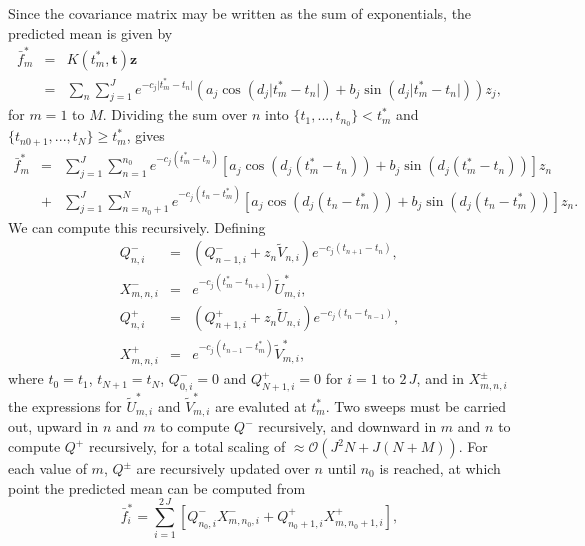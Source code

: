 \documentclass[manuscript, letterpaper]{aastex6}
\newcommand{\bvec}[1]{{\ensuremath{\boldsymbol{#1}}}}
\begin{document}
Since the covariance matrix may be written as the sum of exponentials, the predicted mean is given by
\begin{eqnarray}
\bar f^*_m &=& K(t^*_m,\bvec{t}) \bvec{z} \\
&=& \sum_n \sum_{j=1}^J e^{-c_j \vert t^*_m-t_n\vert}\left(a_j \cos{(d_j \vert t^*_m-t_n\vert)} +b_j \sin{(d_j \vert t^*_m-t_n\vert)}\right) z_j,
\end{eqnarray}
for $m =1$ to $M$.
Dividing the sum over $n$ into $\{t_1,...,t_{n_0}\} < t^*_m$ and
$\{t_{n0+1},...,t_N\} \ge t^*_m$, gives
\begin{eqnarray}
\bar f^*_m &=& \sum_{j=1}^J\sum_{n=1}^{n_0} e^{-c_j(t^*_m-t_n)} \left[a_j \cos{(d_j(t^*_m-t_n))}+b_j\sin{(d_j(t^*_m-t_n))}\right] z_n \\
&+& \sum_{j=1}^J\sum_{n=n_0+1}^N  e^{-c_j(t_n-t^*_m)} \left[a_j \cos{(d_j(t_n-t^*_m))}+b_j\sin{(d_j(t_n-t^*_m))}\right] z_n.
\end{eqnarray}
We can compute this recursively.  Defining
\begin{eqnarray}
Q^-_{n,i} &=& \left(Q^-_{n-1,i}+z_n\tilde V_{n,i}\right)e^{-c_j(t_{n+1}-t_{n})},\\
X^-_{m,n,i} &=& e^{-c_j(t_m^*-t_{n+1})}\tilde U_{m,i}^*,\\
Q^+_{n,i} &=& \left(Q^+_{n+1,i}+z_n\tilde U_{n,i}\right)e^{-c_j(t_{n}-t_{n-1})},\\
X^+_{m,n,i} &=& e^{-c_j(t_{n-1}-t_m^*)} \tilde V_{m,i}^*,
\end{eqnarray}
where $t_0=t_1$, $t_{N+1}=t_N$, $Q^-_{0,i} = 0$ and $Q^+_{N+1,i}=0$ for $i=1$
to $2\,J$, and in $X^\pm_{m,n,i}$ the expressions
for $\tilde U_{m,i}^*$ and $\tilde V_{m,i}^*$ are evaluted at $t_m^*$.
Two sweeps must be carried out, upward in $n$ and $m$ to compute $Q^-$ recursively, and downward in
$m$ and $n$ to compute $Q^+$ recursively, for a total scaling of $\approx \mathcal{O}(J^2N+J(N+M))$.
For each value of $m$, $Q^\pm$ are recursively updated over $n$ until $n_0$ is reached, at which
point the predicted mean can be computed from
\begin{equation}
\bar f^*_i = \sum_{i=1}^{2\,J} \left[Q^-_{n_0,i}X^-_{m,n_0,i}+Q^+_{n_0+1,i}X^+_{m,n_0+1,i}\right],
\end{equation}
\end{document}
